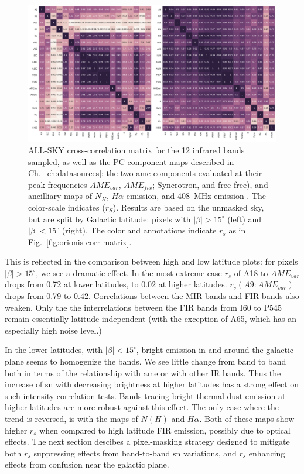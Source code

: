           \begin{figure}
            \includegraphics[width=\textwidth]{../Plots/ch_allsky/all_bands_corr_matrix_wAME_spearmanintensity_unmasked.pdf}
            \centering
            \caption{ALL-SKY cross-correlation matrix for the 12 infrared bands sampled, as well as the PC component maps described in Ch.~\ref{ch:datasources}: the two \acrshort{ame} components evaluated at their peak frequencies $AME_{var}$, $AME_{fix}$; Syncrotron, and free-free), and ancilliary maps of $N_{H}$, $H{\alpha}$ emission, and 408~MHz emission \cite{haslam82}. The color-scale indicates ($r_{S}$). Results are based on the unmasked sky, but are split by Galactic latitude: pixels with $|\beta{}| > 15^{\circ}$ (left) and $|\beta{}| < 15^{\circ}$ (right). The color and annotations indicate $r_{s}$ as in Fig.~\ref{fig:orionis-corr-matrix}. }
            \label{fig:all_bands_corr_matrix_wAME_spearman}
          \end{figure}
       This is reflected in the comparison between high and low latitude plots: for pixels $|\beta| > 15 ^{\circ}$, we see a dramatic effect. In the most extreme case $r_{s}$ of A18 to $AME_{var}$ drops from 0.72 at lower latitudes, to 0.02 at higher latitudes. $r_{s}(A9:AME_{var})$ drops from 0.79 to 0.42. Correlations between the MIR bands and FIR bands also weaken. Only the the interrelations between the FIR bands from I60 to P545 remain essentially latitude independent (with the exception of A65, which has an especially high noise level.)

        In the lower latitudes, with $|\beta| < 15^{\circ}$, bright emission in and around the galactic plane seems to homogenize the bands. We see little change from band to band both in terms of the relationship with \acrshort{ame} or with other IR bands. Thus the increase of \acrshort{sn} with decreasing brightness at higher latitudes has a strong effect on such intensity correlation tests. Bands tracing bright thermal dust emission at higher latitudes are more robust against this effect. The only case where the trend is reversed, is with the maps of $N(H)$ and $H{\alpha}$. Both of these maps show higher $r_{s}$ when compared to high latitude FIR emission, possibly due to optical effects. The next section descibes a pixel-masking strategy designed to mitigate both $r_{s}$ suppressing effects from band-to-band \acrshort{sn} variations, and $r_{s}$ enhancing effects from confusion near the galactic plane.

